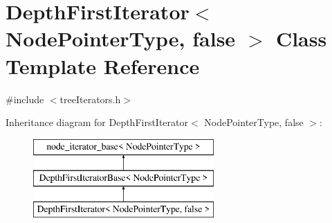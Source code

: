 \hypertarget{classDepthFirstIterator_3_01NodePointerType_00_01false_01_4}{}\section{Depth\+First\+Iterator$<$ Node\+Pointer\+Type, false $>$ Class Template Reference}
\label{classDepthFirstIterator_3_01NodePointerType_00_01false_01_4}


{\ttfamily \#include $<$tree\+Iterators.\+h$>$}

Inheritance diagram for Depth\+First\+Iterator$<$ Node\+Pointer\+Type, false $>$\+:\begin{figure}[H]
\begin{center}
\leavevmode
\includegraphics[height=3.000000cm]{classDepthFirstIterator_3_01NodePointerType_00_01false_01_4}
\end{center}
\end{figure}
